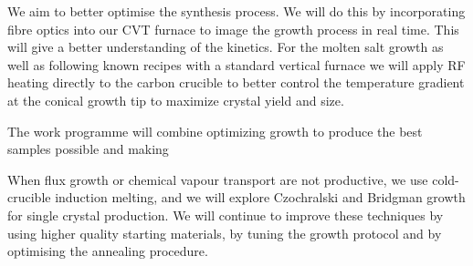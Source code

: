 We aim to better optimise the synthesis process. We will do this by incorporating fibre optics into our CVT furnace to image the growth process in real time. This will give a better understanding of the kinetics. For the molten salt growth as well as following known recipes with a standard vertical furnace we will apply RF heating directly to the carbon crucible to better control the temperature gradient at the conical growth tip to maximize crystal yield and size.

The work programme will combine optimizing growth to produce the best samples possible and making 

  
 
  

When flux growth or chemical vapour transport are not productive, we use cold-crucible %
induction melting, and we will
explore Czochralski and Bridgman growth for single crystal production. We will continue to improve these techniques by using higher quality starting materials, by tuning the growth protocol and by optimising the annealing procedure.  

